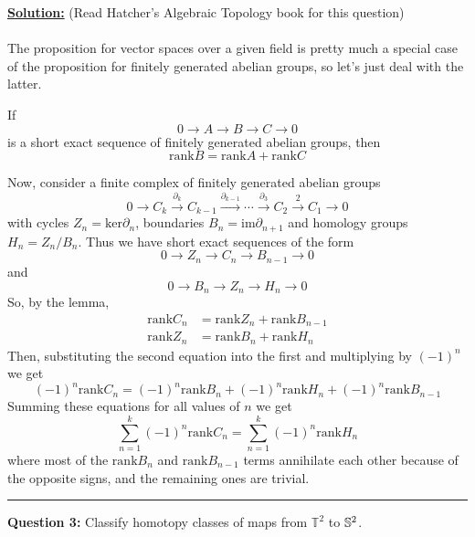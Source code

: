 \documentclass[11pt]{article}
\begin{document}
\vskip 0.5cm
\textbf{\underline{Solution:}} (Read Hatcher's Algebraic Topology book for this question)
\\
\\
The proposition for vector spaces over a given field is pretty much a special case of the proposition for finitely generated abelian groups, so let's just deal with the latter.
\\
\begin{redbox}
  \begin{lemma}
    If $$ 0 \rightarrow A \rightarrow B \rightarrow C \rightarrow 0 $$ is a short exact sequence of finitely generated abelian groups, then $$ \mathrm{rank} B = \mathrm{rank} A + \mathrm{rank} C $$
  \end{lemma}
\end{redbox} Now, consider a finite complex of finitely generated abelian groups $$ 0 \rightarrow C_{k} \xrightarrow{\partial_{k}} C_{k-1} \xrightarrow{\partial_{k-1}} \cdots \xrightarrow{\partial_{3}} C_2 \xrightarrow{2} C_1 \rightarrow 0 $$ with cycles $Z_n = \mathrm{ker} \partial_{n}$, boundaries $B_{n} = \mathrm{im} \partial_{n+1}$ and homology groups $H_n = Z_n/B_n $. Thus we have short exact sequences of the form $$ 0 \rightarrow Z_n \rightarrow C_n \rightarrow B_{n-1} \rightarrow 0 $$ and $$0 \rightarrow B_n \rightarrow Z_n \rightarrow H_n \rightarrow 0$$ So, by the lemma, 
\begin{align*}
  \mathrm{rank} C_n &= \mathrm{rank} Z_n + \mathrm{rank} B_{n-1} \\
  \mathrm{rank} Z_n &= \mathrm{rank} B_n + \mathrm{rank} H_n
\end{align*} Then, substituting the second equation into the first and multiplying by $(-1)^n$ we get $$(-1)^n \mathrm{rank} C_n = (-1)^n \mathrm{rank} B_n + (-1)^n \mathrm{rank} H_n + (-1)^{n} \mathrm{rank} B_{n-1} $$ Summing these equations for all values of $n$ we get $$ \sum_{n = 1}^{k} (-1)^{n} \mathrm{rank} C_n = \sum_{n = 1}^{k} (-1)^n \mathrm{rank} H_n $$ where most of the $\mathrm{rank} B_n$ and $\mathrm{rank} B_{n-1}$ terms annihilate each other because of the opposite signs, and the remaining ones are trivial. 

\vskip 0.5cm
\hrule
\pagebreak



\begin{bluebox}
  \textbf{Question 3:} Classify homotopy classes of maps from $\mathbb{T}^2$ to $\mathbb{S}^2$.
\end{bluebox}
\end{document}
